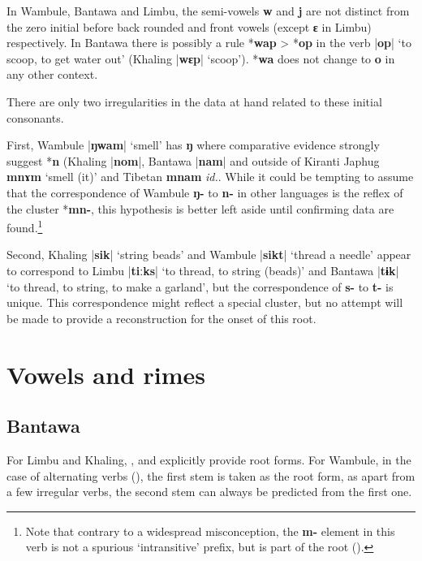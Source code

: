 \documentclass[oneside,a4paper,11pt]{article}
\newcommand{\ipa}[1]{\textbf{{\phon\mbox{#1}}}} %
\newcommand{\dhatu}[2]{|\ipa{#1}| `#2'}
\begin{document}
In Wambule, Bantawa and Limbu, the semi-vowels \ipa{w} and \ipa{j} are not distinct from the zero initial before back rounded and front vowels (except \ipa{ɛ} in Limbu) respectively. In Bantawa there is possibly a rule *\ipa{wap} > *\ipa{op} in the verb \dhatu{op}{to scoop, to get water out} (Khaling \dhatu{wɛp}{scoop}). *\ipa{wa} does not change to \ipa{o} in any other context.

There are only two irregularities in the data at hand related to these initial consonants.

First, Wambule \dhatu{ŋwam}{smell} has \ipa{ŋ} where comparative evidence strongly suggest *\ipa{n} (Khaling |\ipa{nom}|, Bantawa  |\ipa{nam}| and outside of Kiranti Japhug \ipa{mnɤm} `smell (it)' and Tibetan \ipa{mnam} \textit{id.}. While it could be tempting to assume that the correspondence of Wambule \ipa{ŋ-} to \ipa{n-} in other languages is the reflex of the cluster *\ipa{mn-}, this hypothesis is better left aside until confirming data are found.\footnote{Note that contrary to a widespread misconception, the \ipa{m-} element in this verb is not a spurious 
`intransitive' prefix, but is part of the root (\citealt{hill14derivational, jacques14snom}).}

Second, Khaling \dhatu{sik}{string beads} and Wambule \dhatu{sikt}{thread a needle} appear to correspond to Limbu \dhatu{tiːks}{to thread, to string (beads)}  and Bantawa \dhatu{tɨk}{to thread, to string, to make a garland}, but the correspondence of \ipa{s-} to \ipa{t-} is unique. This correspondence might reflect a special cluster, but no attempt will be made to provide a reconstruction for the onset of this root.

\section{Vowels and rimes} \label{sec:rhymes}

\subsection{Bantawa} \label{sec:bantawa}
 
 For Limbu and Khaling, \citet{michailovsky02dico}, \citet{jacques12khaling} and \citet{jacques16si} explicitly provide root forms. For Wambule, in the case of alternating verbs (\citealt[255-263]{opgenort04wambule}), the first stem is taken as the root form, as apart from a few irregular verbs, the second stem can always be predicted from the first one.  
 
\end{document}
